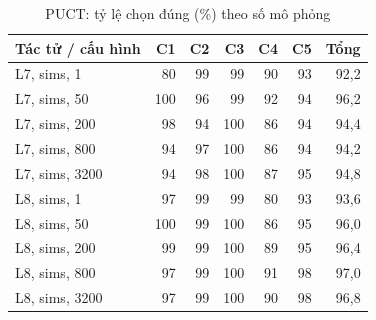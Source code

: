 \begin{table}[H]
  \centering
  \small
  \caption{PUCT: tỷ lệ chọn đúng (\%) theo số mô phỏng}
  \label{tab:cs-ct-puct}
  \begin{tabular}{lrrrrrr}
    \toprule
    Tác tử / cấu hình & C1 & C2 & C3 & C4 & C5 & Tổng \\
    \midrule
    L7, sims, 1 & 80 & 99 & 99 & 90 & 93 & 92,2 \\
    L7, sims, 50 & 100 & 96 & 99 & 92 & 94 & 96,2 \\
    L7, sims, 200 & 98 & 94 & 100 & 86 & 94 & 94,4 \\
    L7, sims, 800 & 94 & 97 & 100 & 86 & 94 & 94,2 \\
    L7, sims, 3200 & 94 & 98 & 100 & 87 & 95 & 94,8 \\
    \midrule
    L8, sims, 1 & 97 & 99 & 99 & 80 & 93 & 93,6 \\
    L8, sims, 50 & 100 & 99 & 100 & 86 & 95 & 96,0 \\
    L8, sims, 200 & 99 & 99 & 100 & 89 & 95 & 96,4 \\
    L8, sims, 800 & 97 & 99 & 100 & 91 & 98 & 97,0 \\
    L8, sims, 3200 & 97 & 99 & 100 & 90 & 98 & 96,8 \\
    \bottomrule
  \end{tabular}
\end{table}
